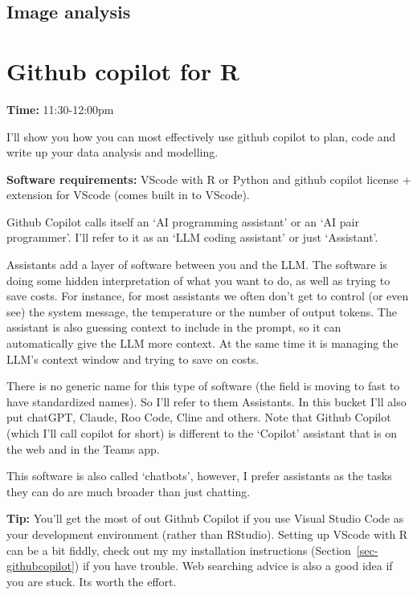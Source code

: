 \documentclass[
  letterpaper,
  DIV=11,
  numbers=noendperiod]{scrreprt}
\begin{document}
\section{Image analysis}\label{image-analysis}


\chapter{Github copilot for R}\label{sec-githubcopilot-chapter}

\textbf{Time:} 11:30-12:00pm

I'll show you how you can most effectively use github copilot to plan,
code and write up your data analysis and modelling.

\textbf{Software requirements:} VScode with R or Python and github
copilot license + extension for VScode (comes built in to VScode).

Github Copilot calls itself an `AI programming assistant' or an `AI pair
programmer'. I'll refer to it as an `LLM coding assistant' or just
`Assistant'.

Assistants add a layer of software between you and the LLM. The software
is doing some hidden interpretation of what you want to do, as well as
trying to save costs. For instance, for most assistants we often don't
get to control (or even see) the system message, the temperature or the
number of output tokens. The assistant is also guessing context to
include in the prompt, so it can automatically give the LLM more
context. At the same time it is managing the LLM's context window and
trying to save on costs.

There is no generic name for this type of software (the field is moving
to fast to have standardized names). So I'll refer to them Assistants.
In this bucket I'll also put chatGPT, Claude, Roo Code, Cline and
others. Note that Github Copilot (which I'll call copilot for short) is
different to the `Copilot' assistant that is on the web and in the Teams
app.

This software is also called `chatbots', however, I prefer assistants as
the tasks they can do are much broader than just chatting.

\textbf{Tip:} You'll get the most of out Github Copilot if you use
Visual Studio Code as your development environment (rather than
RStudio). Setting up VScode with R can be a bit fiddly, check out my my
installation instructions (Section~\ref{sec-githubcopilot}) if you have
trouble. Web searching advice is also a good idea if you are stuck. Its
worth the effort.
\end{document}
